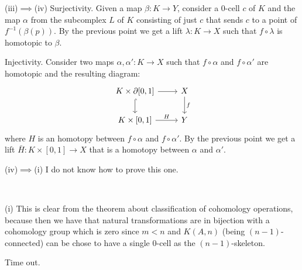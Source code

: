 \documentclass[a4paper,11pt,english]{article}
\begin{document}
\begin{exercise}[2]
(iii)$\implies$(iv) Surjectivity. Given a map $\beta:K\to Y$, consider a $0$-cell $c$ of $K$ and the map $\alpha$ from the subcomplex $L$ of $K$ consisting of just $c$ that sends $c$ to a point of $f^{-1}(\beta(p))$. By the previous point we get a lift $\lambda:K\to X$ such that $f\circ\lambda$ is homotopic to $\beta$.

Injectivity. Consider two maps $\alpha,\alpha':K\to X$ such that $f\circ\alpha$ and $f\circ\alpha'$ are homotopic and the resulting diagram:
\[
    \begin{tikzcd}
    K\times\de[0,1] \arrow[d,hook] \arrow[r] & X \arrow[d,"f"] \\
    K\times[0,1] \arrow[r,"H"] & Y
    \end{tikzcd}
\]
where $H$ is an homotopy between $f\circ\alpha$ and $f\circ\alpha'$. By the previous point we get a lift $\bar H:K\times[0,1]\to X$ that is a homotopy between $\alpha$ and $\alpha'$.

(iv)$\implies$(i) I do not know how to prove this one.

\end{exercise}

\begin{exercise}[3]\ 

(i) This is clear from the theorem about classification of cohomology operations, because then we have that natural transformations are in bijection with a cohomology group which is zero since $m<n$ and $K(A,n)$ (being $(n-1)$-connected) can be chose to have a single $0$-cell as the $(n-1)$-skeleton.

Time out.

\end{exercise}
\end{document}
